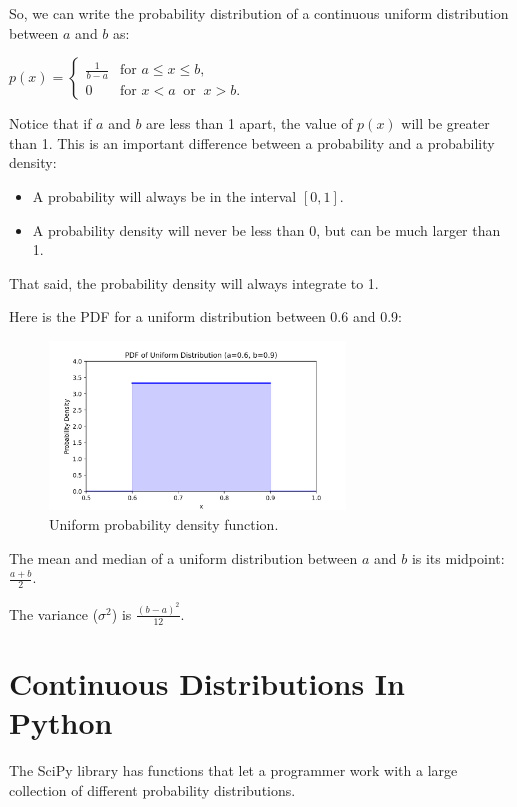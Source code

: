 So, we can write the probability distribution of a continuous uniform distribution between $a$ and $b$ as:

  $p(x) = \begin{cases}
  \frac{1}{b-a} & \text{for } a \le x \le b, \\[8pt]
  0 & \text{for } x < a \ \text{ or } \ x > b.
  \end{cases}$

Notice that if $a$ and $b$ are less than 1 apart,  the value of $p(x)$ will be greater than 1. This is an important difference between a probability and a probability density: 
\begin{itemize}
\item A probability will always be in the interval $[0, 1]$. 
\item A probability density will never be less than 0,  but can be much larger than 1.
\end{itemize}

That said, the probability density will always integrate to 1.

Here is the PDF for a uniform distribution between 0.6 and 0.9:
\begin{figure}[htbp]
    \centering
    \includegraphics[width=0.7\textwidth]{unif_pdf2.png}
    \caption{Uniform probability density function.}
    \label{fig:unif_pdf2}
\end{figure}

The mean and median of a uniform distribution between $a$ and $b$ is its midpoint:  $\frac{a+b}{2}$.

The variance ($\sigma^2$) is $\frac{(b -a)^2}{12}$.

\section{Continuous Distributions In Python}
The SciPy library has functions that let a programmer work with a large collection of different probability distributions.

